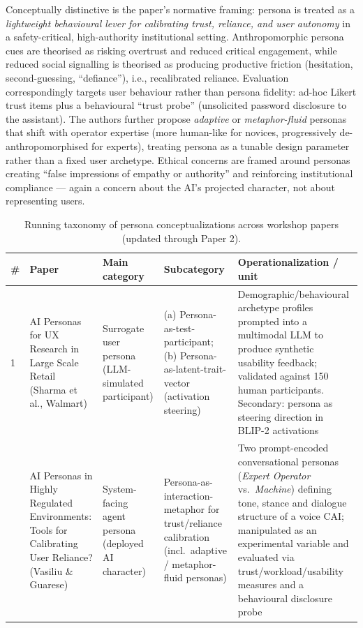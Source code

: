 Conceptually distinctive is the paper's normative framing: persona is treated as a \emph{lightweight behavioural lever for calibrating trust, reliance, and user autonomy} in a safety-critical, high-authority institutional setting. Anthropomorphic persona cues are theorised as risking overtrust and reduced critical engagement, while reduced social signalling is theorised as producing productive friction (hesitation, second-guessing, ``defiance''), i.e., recalibrated reliance. Evaluation correspondingly targets user behaviour rather than persona fidelity: ad-hoc Likert trust items plus a behavioural ``trust probe'' (unsolicited password disclosure to the assistant). The authors further propose \emph{adaptive} or \emph{metaphor-fluid} personas that shift with operator expertise (more human-like for novices, progressively de-anthropomorphised for experts), treating persona as a tunable design parameter rather than a fixed user archetype. Ethical concerns are framed around personas creating ``false impressions of empathy or authority'' and reinforcing institutional compliance --- again a concern about the AI's projected character, not about representing users.

\begin{table}[t]
\centering
\caption{Running taxonomy of persona conceptualizations across workshop papers (updated through Paper 2).}
\label{tab:persona-taxonomy}
\small
\begin{tabular}{p{0.5cm} p{3.6cm} p{3.4cm} p{3.6cm} p{3.6cm}}
\toprule
\textbf{\#} & \textbf{Paper} & \textbf{Main category} & \textbf{Subcategory} & \textbf{Operationalization / unit} \\
\midrule
1 & AI Personas for UX Research in Large Scale Retail (Sharma et al., Walmart) &
Surrogate user persona (LLM-simulated participant) &
(a) Persona-as-test-participant; (b) Persona-as-latent-trait-vector (activation steering) &
Demographic/behavioural archetype profiles prompted into a multimodal LLM to produce synthetic usability feedback; validated against 150 human participants. Secondary: persona as steering direction in BLIP-2 activations \\
\addlinespace
2 & AI Personas in Highly Regulated Environments: Tools for Calibrating User Reliance? (Vasiliu \& Guarese) &
System-facing agent persona (deployed AI character) &
Persona-as-interaction-metaphor for trust/reliance calibration (incl.\ adaptive / metaphor-fluid personas) &
Two prompt-encoded conversational personas (\textit{Expert Operator} vs.\ \textit{Machine}) defining tone, stance and dialogue structure of a voice CAI; manipulated as an experimental variable and evaluated via trust/workload/usability measures and a behavioural disclosure probe \\
\bottomrule
\end{tabular}
\end{table}
